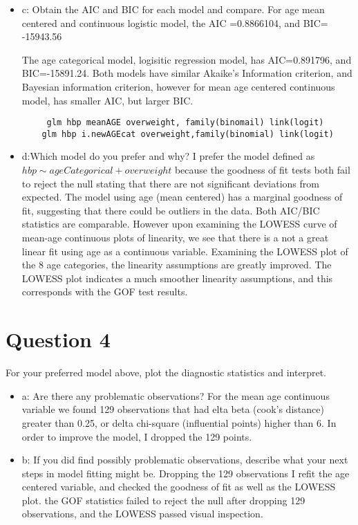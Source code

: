 \documentclass{article}
\begin{document}
\begin{itemize}
    \item c:  Obtain the AIC and BIC for each model and compare.
     For age mean centered and continuous logistic model, the AIC =0.8866104, and BIC= -15943.56
    
     The age categorical model, logisitic regression model, has AIC=0.891796, and BIC=-15891.24.
     Both models have similar Akaike's Information criterion, and Bayesian information criterion, however for mean age centered continuous model, has smaller AIC, but larger BIC.  
     \begin{verbatim}
     glm hbp meanAGE overweight, family(binomail) link(logit)
    glm hbp i.newAGEcat overweight,family(binomial) link(logit)
     \end{verbatim}
     
    \item d:Which model do you prefer and why?  
      I prefer the model defined as $hbp \sim ageCategorical + overweight$ because the goodness of fit tests both fail to reject the null stating that there are not significant deviations from expected.  The model using age (mean centered) has a marginal goodness of fit, suggesting that there could be outliers in the data.  Both AIC/BIC statistics are comparable.  However upon examining the LOWESS curve of mean-age continuous plots of linearity, we see that there is a not a great linear fit using age as a continuous variable.
      Examining the LOWESS plot of the 8 age categories, the linearity assumptions are greatly improved. The LOWESS plot indicates a much smoother linearity assumptions, and this corresponds with the GOF test results. 
    
\end{itemize}

\section{Question 4}
 For your preferred model above, plot the diagnostic statistics and interpret. 
 
  \begin{itemize}
      \item a: Are there any problematic observations?
      For the mean age continuous variable we found 129 observations that had elta beta (cook's distance) greater than 0.25, or delta chi-square (influential points) higher than 6.  In order to improve the model, I dropped the 129 points. 
      \item b: If you did find possibly problematic observations, describe what your next steps in model fitting might be.
       Dropping the 129 observations I refit the age centered variable, and checked the goodness of fit as well as the LOWESS plot.  the GOF statistics failed to reject the null after dropping 129 observations, and the LOWESS passed visual inspection.
  \end{itemize}
\end{document}
